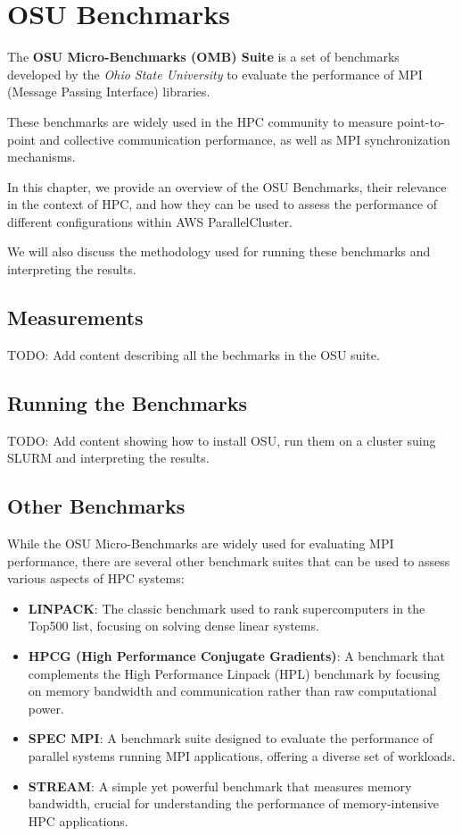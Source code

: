

\chapter{OSU Benchmarks}

The \textbf{OSU Micro-Benchmarks (OMB) Suite} is a set of benchmarks developed by the \textit{Ohio State University} to evaluate the performance of MPI (Message Passing Interface) libraries. 

These benchmarks are widely used in the HPC community to measure point-to-point and collective communication performance, as well as MPI synchronization mechanisms.

In this chapter, we provide an overview of the OSU Benchmarks, their relevance in the context of HPC, and how they can be used to assess the performance of different configurations within AWS ParallelCluster. 

We will also discuss the methodology used for running these benchmarks and interpreting the results.

\section{Measurements}

TODO: Add content describing all the bechmarks in the OSU suite.

\section{Running the Benchmarks}

TODO: Add content showing how to install OSU, run them on a cluster suing SLURM and interpreting the results.

\section{Other Benchmarks}
While the OSU Micro-Benchmarks are widely used for evaluating MPI performance, there are several other benchmark suites that can be used to assess various aspects of HPC systems:

\begin{itemize}
    \item \textbf{LINPACK}: The classic benchmark used to rank supercomputers in the Top500 list, focusing on solving dense linear systems.
    \item \textbf{HPCG (High Performance Conjugate Gradients)}: A benchmark that complements the High Performance Linpack (HPL) benchmark by focusing on memory bandwidth and communication rather than raw computational power.
    \item \textbf{SPEC MPI}: A benchmark suite designed to evaluate the performance of parallel systems running MPI applications, offering a diverse set of workloads.
    \item \textbf{STREAM}: A simple yet powerful benchmark that measures memory bandwidth, crucial for understanding the performance of memory-intensive HPC applications.
\end{itemize}